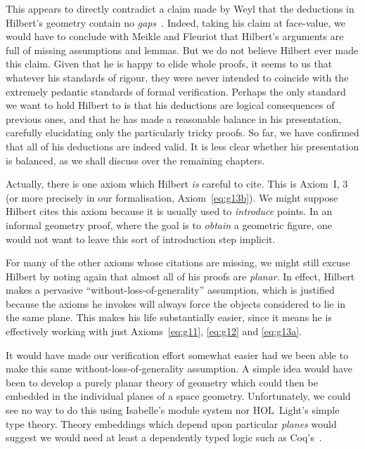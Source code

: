 This appears to directly contradict a claim made by Weyl that the deductions in Hilbert's geometry contain no \emph{gaps}~\cite{TableChairMug}. Indeed, taking his claim at face-value, we would have to conclude with Meikle and Fleuriot that Hilbert's arguments are full of missing assumptions and lemmas. But we do not believe Hilbert ever made this claim. Given that he is happy to elide whole proofs, it seems to us that whatever his standards of rigour, they were never intended to coincide with the extremely pedantic standards of formal verification. Perhaps the only standard we want to hold Hilbert to is that his deductions are logical consequences of previous ones, and that he has made a reasonable balance in his presentation, carefully elucidating only the particularly tricky proofs. So far, we have confirmed that all of his deductions are indeed valid. It is less clear whether his presentation is balanced, as we shall discuss over the remaining chapters.

Actually, there is one axiom which Hilbert \emph{is} careful to cite. This is Axiom~I, 3 (or more precisely in our formalisation, Axiom~\ref{eq:g13b}). We might suppose Hilbert cites this axiom because it is usually used to \emph{introduce} points. In an informal geometry proof, where the goal is to \emph{obtain} a geometric figure, one would not want to leave this sort of introduction step implicit. 

\label{sec:PlanarProofs}For many of the other axioms whose citations are missing, we might still excuse Hilbert by noting again that almost all of his proofs are \emph{planar}. In effect, Hilbert makes a pervasive ``without-loss-of-generality'' assumption, which is justified because the axioms he invokes will always force the objects considered to lie in the same plane. This makes his life substantially easier, since it means he is effectively working with just Axioms~\ref{eq:g11}, \ref{eq:g12} and \ref{eq:g13a}. 

It would have made our verification effort somewhat easier had we been able to make this same without-loss-of-generality assumption. A simple idea would have been to develop a purely planar theory of geometry which could then be embedded in the individual planes of a space geometry. Unfortunately, we could see no way to do this using Isabelle's module system nor HOL~Light's simple type theory. Theory embeddings which depend upon particular \emph{planes} would suggest we would need at least a dependently typed logic such as Coq's~\cite{Coq}.

